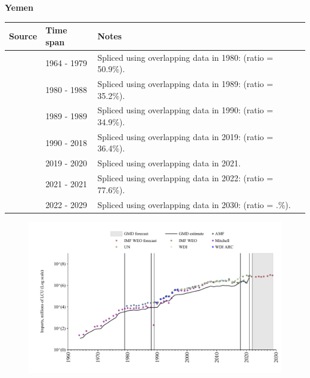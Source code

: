 \documentclass[12pt,a4paper,landscape]{article}
\begin{document}
\begin{adjustbox}{max totalsize={\paperwidth}{\paperheight},center}
\begin{minipage}[t][\textheight][t]{\textwidth}
\vspace*{0.5cm}
{}
\begin{center}
{\Large\bfseries Yemen}
\end{center}
\vspace{0.5cm}
\begin{table}[H]
\centering
\small
\begin{tabular}{|l|l|l|}
\hline
\textbf{Source} & \textbf{Time span} & \textbf{Notes} \\
\hline
\rowcolor{white}\cite{Mitchell}& 1964 - 1979 &Spliced using overlapping data in 1980: (ratio = 50.9\%).\\
\rowcolor{lightgray}\cite{AMF}& 1980 - 1988 &Spliced using overlapping data in 1989: (ratio = 35.2\%).\\
\rowcolor{white}\cite{UN}& 1989 - 1989 &Spliced using overlapping data in 1990: (ratio = 34.9\%).\\
\rowcolor{lightgray}\cite{WDI}& 1990 - 2018 &Spliced using overlapping data in 2019: (ratio = 36.4\%).\\
\rowcolor{white}\cite{UN}& 2019 - 2020 &Spliced using overlapping data in 2021.\\
\rowcolor{lightgray}\cite{AMF}& 2021 - 2021 &Spliced using overlapping data in 2022: (ratio = 77.6\%).\\
\rowcolor{white}\cite{IMF_WEO_forecast}& 2022 - 2029 &Spliced using overlapping data in 2030: (ratio = .\%).\\
\hline
\end{tabular}
\end{table}
\begin{figure}[H]
\centering
\includegraphics[width=\textwidth,height=0.6\textheight,keepaspectratio]{graphs/YEM_imports.pdf}
\end{figure}
\end{minipage}
\end{adjustbox}
\end{document}

